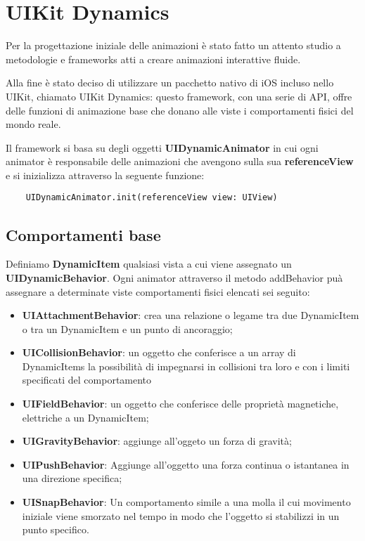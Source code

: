 \section{UIKit Dynamics}

Per la progettazione iniziale delle animazioni è stato fatto un attento studio a metodologie e frameworks
atti a creare animazioni interattive fluide.

Alla fine è stato deciso di utilizzare un pacchetto
nativo di iOS incluso nello UIKit\cite{uikit}, chiamato UIKit Dynamics\cite{uidynamics}: questo framework,
con una serie di API, offre delle funzioni di animazione base che 
donano alle viste i comportamenti fisici del mondo reale.

Il framework si basa su degli oggetti \textbf{UIDynamicAnimator} in cui ogni animator è responsabile delle
animazioni che avengono sulla sua \textbf{referenceView} e si inizializza 
attraverso la seguente funzione:

\begin{verbatim}
    UIDynamicAnimator.init(referenceView view: UIView)
\end{verbatim}


\subsection{Comportamenti base}

Definiamo \textbf{DynamicItem} qualsiasi vista a cui viene assegnato un \textbf{UIDynamicBehavior}.
Ogni animator attraverso il metodo addBehavior puà assegnare a determinate
viste comportamenti fisici elencati sei seguito: 

\begin{itemize}
    \item\textbf{UIAttachmentBehavior}: crea una relazione o legame tra due DynamicItem o tra un DynamicItem e un punto di ancoraggio;
    \item\textbf{UICollisionBehavior}: un oggetto che conferisce a un array di DynamicItems la possibilità di impegnarsi in collisioni tra loro e con i limiti specificati del comportamento
    \item\textbf{UIFieldBehavior}: un oggetto che conferisce delle proprietà magnetiche, elettriche a un DynamicItem;
    \item\textbf{UIGravityBehavior}: aggiunge all'oggeto un forza di gravità;
    \item\textbf{UIPushBehavior}: Aggiunge all'oggetto una forza continua o istantanea in una direzione specifica;
    \item\textbf{UISnapBehavior}: Un comportamento simile a una molla il cui movimento iniziale viene smorzato nel tempo in modo che l'oggetto si stabilizzi in un punto specifico.
\end{itemize}

